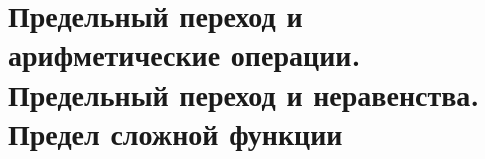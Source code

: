 \section{Предельный переход и арифметические операции. Предельный переход и неравенства. Предел сложной функции}